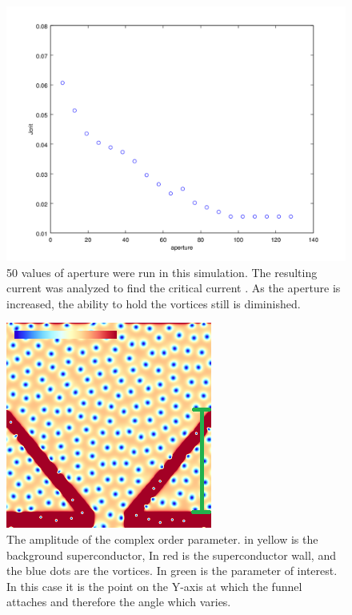 \begin{figure}[htbp]
\begin{center}
\includegraphics[scale=.50]{normalXscan.png}
\caption{ 50 values of aperture were run in this simulation. The resulting current was analyzed to find the critical current . As the aperture is increased, the ability to hold the vortices still is diminished. }
\label{normalXscan}
\end{center}
\end{figure}

\begin{figure}[htbp]
\begin{center}
\includegraphics[scale=.50]{normalY.png}
\caption{ The amplitude of the complex order parameter. in yellow is the background superconductor, In red is the superconductor wall, and the blue dots are the vortices. In green is the parameter of interest. In this case it is the point on the Y-axis at which the funnel attaches and therefore the angle which varies. }
\label{normalY}
\end{center}
\end{figure}

